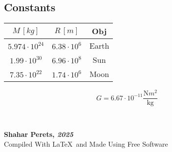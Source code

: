 \documentclass[]{article}
\newcommand\ndoc  {\dotfill \\ \vfil {\begin{center}
            {\textbf{Shahar Perets, \textit{2025}} \\
                \scriptsize {Compiled With \LaTeX \, and Made Using Free Software}}
    \end{center}} \vfil	}
\begin{document}
\begin{multicols}{3}
        \section{Constants}
        \begin{center}
            \begin{tabular}{|c|c|c|}
                \hline $M \,[kg]$ & $R \,[m]$ & Obj \\
                \hline $5.974\cdot 10^{24}$ & $6.38\cdot 10^{6}$ &Earth \\
                \hline $1.99 \cdot 10^{30}$ & $6.96 \cdot 10^{8}$ & Sun \\
                \hline $7.35 \cdot 10^{22}$ & $1.74 \cdot 10^{6}$ & Moon \\
                \hline
            \end{tabular}
        \end{center}
        \[ G = 6.67 \cdot 10^{-11} \frac{\mathrm{N}m^2}{\mathrm{kg}} \]
	\end{multicols}
	\ndoc
	
\end{document}
